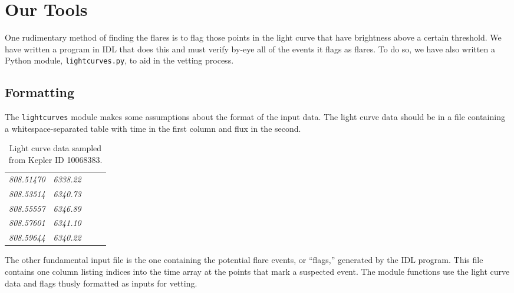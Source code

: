 \documentclass[11pt]{article}
\begin{document}

\section{Our Tools}
\label{sec:tools}
One rudimentary method of finding the flares is to flag those points
in the light curve that have brightness above a certain threshold.  We
have written a program in IDL that does this and must verify by-eye
all of the events it flags as flares.  
To do so, we have also written a Python module, \verb|lightcurves.py|,
to aid in the vetting process.

\subsection{Formatting}
\label{sec:format}
The \verb|lightcurves| module makes some assumptions about the format
of the input data.  The light curve data should be in a file
containing a whitespace-separated table with time in the first column
and flux in the second.
\begin{table}[h]
  \centering
  \begin{tabular}{>{\itshape}p{0.2\linewidth} >{\itshape}l}
       808.51470   &   6338.22 \\
       808.53514   &   6340.73 \\
       808.55557   &   6346.89 \\
       808.57601   &   6341.10 \\
       808.59644   &   6340.22 \\
  \end{tabular}
  \caption{Light curve data sampled from Kepler ID 10068383.}
\end{table}

The other fundamental input file is the one containing the potential
flare events, or ``flags,'' generated by the IDL program.  This file
contains one column listing indices into the time array at the points
that mark a suspected event.  The module functions use the light curve
data and flags thusly formatted as inputs for vetting.

\end{document}
